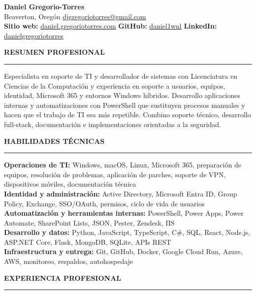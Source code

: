 \documentclass[letterpaper,10pt]{article}
\newcommand{\resumesection}[1]{%
  \vspace{4pt}
  {\large\bfseries\MakeUppercase{#1}}\par
  \vspace{2pt}
  \hrule
  \vspace{2.5pt}
}
\begin{document}
\begin{center}
  {\LARGE\bfseries Daniel Gregorio-Torres}\\[4pt]
  Beaverton, Oregón \textbar{}
  \href{mailto:djgregoriotorres@gmail.com}{djgregoriotorres@gmail.com}
  \\[2pt]
  \textbf{Sitio web:} \href{https://daniel.gregoriotorres.com/es/}{daniel.gregoriotorres.com} \textbar{}
  \textbf{GitHub:} \href{https://github.com/daniel1wnl}{daniel1wnl} \textbar{}
  \textbf{LinkedIn:} \href{https://linkedin.com/in/danielgregoriotorres}{danielgregoriotorres}
\end{center}

\resumesection{Resumen profesional}

Especialista en soporte de TI y desarrollador de sistemas con Licenciatura en Ciencias de la Computación y experiencia en soporte a usuarios, equipos, identidad, Microsoft 365 y entornos Windows híbridos. Desarrollo aplicaciones internas y automatizaciones con PowerShell que sustituyen procesos manuales y hacen que el trabajo de TI sea más repetible. Combino soporte técnico, desarrollo full-stack, documentación e implementaciones orientadas a la seguridad.

\resumesection{Habilidades técnicas}

\textbf{Operaciones de TI:} Windows, macOS, Linux, Microsoft 365, preparación de equipos, resolución de problemas, aplicación de parches, soporte de VPN, dispositivos móviles, documentación técnica\\
\textbf{Identidad y administración:} Active Directory, Microsoft Entra ID, Group Policy, Exchange, SSO/OAuth, permisos, ciclo de vida de usuarios\\
\textbf{Automatización y herramientas internas:} PowerShell, Power Apps, Power Automate, SharePoint Lists, JSON, Pester, Zendesk, IIS\\
\textbf{Desarrollo y datos:} Python, JavaScript, TypeScript, C\#, SQL, React, Node.js, ASP.NET Core, Flask, MongoDB, SQLite, APIs REST\\
\textbf{Infraestructura y entrega:} Git, GitHub, Docker, Google Cloud Run, Azure, AWS, monitoreo, respaldos, autohospedaje

\resumesection{Experiencia profesional}
\end{document}
